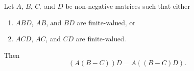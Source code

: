 Let $A$, $B$, $C$, and $D$ be non-negative matrices such that either
\begin{enumerate}
  \item $ABD$, $AB$, and $BD$ are finite-valued, or
  \item $ACD$, $AC$, and $CD$ are finite-valued.
\end{enumerate}
Then
$$(A(B - C))D = A((B - C)D).$$
